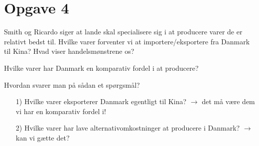 \section{Opgave 4}

\begin{frame}
Smith og Ricardo siger at lande skal specialisere sig i at producere varer de er relativt bedst til. Hvilke varer forventer vi at importere/eksportere fra Danmark til Kina? Hvad viser handelsmønstrene os?
\end{frame}


\begin{frame}{Hvilke varer har Danmark en komparativ fordel i at producere?}

Hvordan svarer man på sådan et spørgsmål?
\begin{itemize}
  \item[1)] Hvilke varer eksporterer Danmark egentligt til Kina? $\rightarrow$ det må være dem vi har en komparativ fordel i!
  \item[2)] Hvilke varer har lave alternativomkostninger at producere i Danmark? $\rightarrow$ kan vi gætte det?
\end{itemize}

\end{frame}
